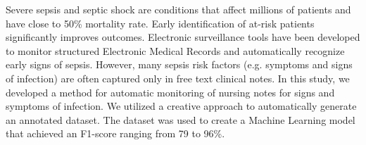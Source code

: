 Severe sepsis and septic shock are conditions that affect millions of patients and have close to 50\% mortality rate. Early identification of at-risk patients significantly improves outcomes. Electronic surveillance tools have been developed to monitor structured Electronic Medical Records and automatically recognize early signs of sepsis. However, many sepsis risk factors (e.g. symptoms and signs of infection) are often captured only in free text clinical notes. In this study, we developed a method for automatic monitoring of nursing notes for signs and symptoms of infection. We utilized a creative approach to automatically generate an annotated dataset. The dataset was used to create a Machine Learning model that achieved an F1-score ranging from 79 to 96\%.

